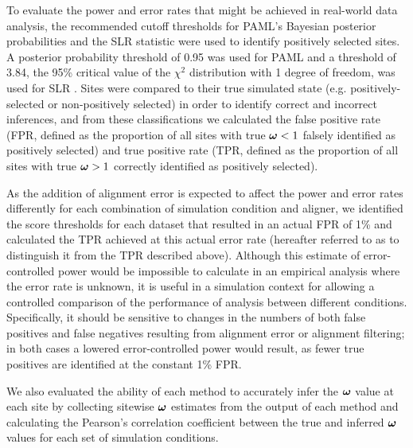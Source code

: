 \documentclass{article}
\begin{document}
To evaluate the power and error rates that might be achieved in
real-world data analysis, the recommended cutoff thresholds for PAML's
Bayesian posterior probabilities and the SLR statistic were used to
identify positively selected sites. A posterior probability threshold
of 0.95 was used for PAML \citep{Yang2005Bayes} and a threshold of 3.84,
the 95\% critical value of the $\chi^2$ distribution with 1 degree
of freedom, was used for SLR \citep{Massingham2005Detecting}. Sites were
compared to their true simulated state (e.g. positively-selected or
non-positively selected) in order to identify correct and incorrect
inferences, and from these classifications we calculated the false
positive rate (FPR, defined as the proportion of all sites with true
$\bm{\omega}<1$ falsely identified as positively selected) and true positive rate
(TPR, defined as the proportion of all sites with true $\bm{\omega}>1$ correctly
identified as positively selected).

As the addition of alignment error is expected to affect the power and
error rates differently for each combination of simulation condition
and aligner, we identified the score thresholds for each dataset that
resulted in an actual FPR of 1\% and calculated the TPR achieved at
this actual error rate (hereafter referred to as \tpr{} to distinguish
it from the TPR described above). Although this estimate of
error-controlled power would be impossible to calculate in an
empirical analysis where the error rate is unknown, it is useful in a
simulation context for allowing a controlled comparison of the
performance of \sw analysis between different
conditions. Specifically, it should be sensitive to changes in the
numbers of both false positives and false negatives resulting from
alignment error or alignment filtering; in both cases a lowered
error-controlled power would result, as fewer true positives are
identified at the constant 1\% FPR.

We also evaluated the ability of each method to accurately infer the
$\bm{\omega}$ value at each site by collecting sitewise $\bm{\omega}$ estimates from
the output of each method and calculating the Pearson's correlation
coefficient between the true and inferred $\bm{\omega}$ values for each set
of simulation conditions.
\end{document}
